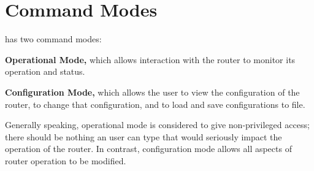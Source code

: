 \noindent{}
\vspace{0.1in}


\newpage
\section{Command Modes}

\xorpsh has two command modes:
\begin{description}
\item{\bf Operational Mode,}  which allows interaction with the router
to monitor its operation and status.
\item{\bf Configuration Mode,} which allows the user to view the
configuration of the router, to change that configuration, and to
load and save configurations to file.
\end{description}
Generally speaking, operational mode is considered to give
non-privileged access; there should be nothing an user can type that
would seriously impact the operation of the router.  In contrast,
configuration mode allows all aspects of router operation to be
modified.

